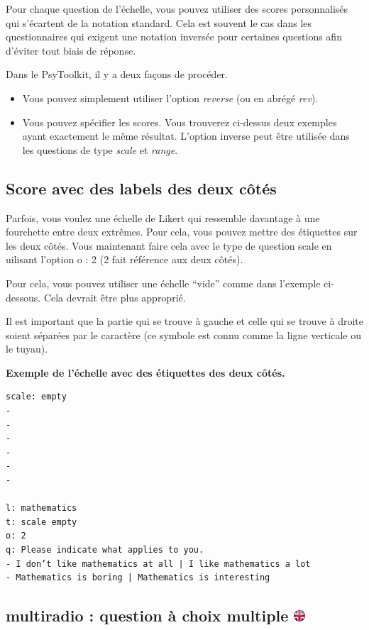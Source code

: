 \documentclass[
]{book}
\providecommand{\tightlist}{%
  \setlength{\itemsep}{0pt}\setlength{\parskip}{0pt}}
\begin{document}
Pour chaque question de l'échelle, vous pouvez utiliser des scores personnalisés qui s'écartent de la notation standard. Cela est souvent le cas dans les questionnaires qui exigent une notation inversée pour certaines questions afin d'éviter tout biais de réponse.

Dans le PsyToolkit, il y a deux façons de procéder.

\begin{itemize}
\tightlist
\item
  Vous pouvez simplement utiliser l'option \emph{reverse} (ou en abrégé \emph{rev}).
\item
  Vous pouvez spécifier les scores. Vous trouverez ci-dessus deux exemples ayant exactement le même résultat. L'option inverse peut être utilisée dans les questions de type \emph{scale} et \emph{range}.
\end{itemize}

\hypertarget{score-avec-des-labels-des-deux-cuxf4tuxe9s}{%
\subsection{Score avec des labels des deux côtés}\label{score-avec-des-labels-des-deux-cuxf4tuxe9s}}

Parfois, vous voulez une échelle de Likert qui ressemble davantage à une fourchette entre deux extrêmes. Pour cela, vous pouvez mettre des étiquettes sur les deux côtés. Vous maintenant faire cela avec le type de question scale en uilisant l'option o : 2 (2 fait référence aux deux côtés).

Pour cela, vous pouvez utiliser une échelle ``vide'' comme dans l'exemple ci-dessous. Cela devrait être plus approprié.

Il est important que la partie qui se trouve à gauche et celle qui se trouve à droite soient séparées par le caractère \textbar{} (ce symbole est connu comme la ligne verticale ou le tuyau).

\textbf{Exemple de l'échelle avec des étiquettes des deux côtés.}

\begin{verbatim}
scale: empty
-
-
-
-
-
-

l: mathematics
t: scale empty
o: 2
q: Please indicate what applies to you.
- I don’t like mathematics at all | I like mathematics a lot
- Mathematics is boring | Mathematics is interesting
\end{verbatim}

\hypertarget{multiradio-question-uxe0-choix-multiple}{%
\subsection[multiradio : question à choix multiple ]{\texorpdfstring{multiradio : question à choix multiple \href{https://www.psytoolkit.org/doc3.4.0/online-survey-syntax.html\#multiradio}{\protect\includegraphics{img/ukflag.png}}}{multiradio : question à choix multiple }}\label{multiradio-question-uxe0-choix-multiple}}
\end{document}
